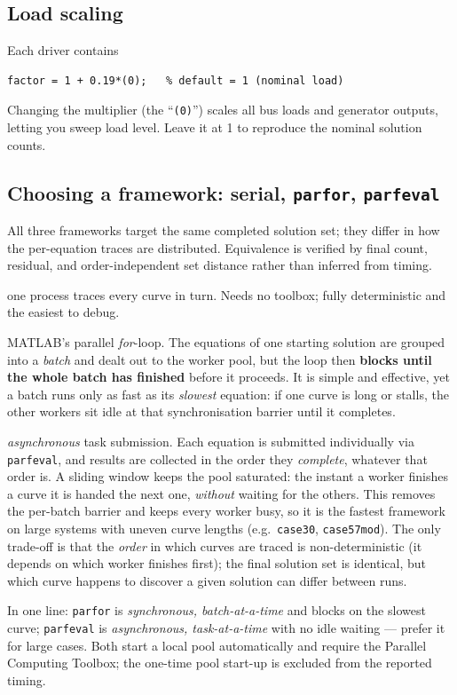 \documentclass[11pt,a4paper]{article}
\newcommand{\code}[1]{\texttt{#1}}
\begin{document}
\subsection{Load scaling}
Each driver contains
\begin{lstlisting}[style=mat]
factor = 1 + 0.19*(0);   % default = 1 (nominal load)
\end{lstlisting}
Changing the multiplier (the ``\code{(0)}'') scales all bus loads and generator outputs,
letting you sweep load level. Leave it at 1 to reproduce the nominal solution counts.

\subsection{Choosing a framework: serial, \code{parfor}, \code{parfeval}}\label{sec:frameworks}
All three frameworks target the same completed solution set; they differ in how the
per-equation traces are distributed. Equivalence is verified by final count, residual,
and order-independent set distance rather than inferred from timing.
\begin{description}[leftmargin=0em,style=nextline]
\item[Serial (\code{run_batch.m})] one process traces every curve in turn. Needs no
      toolbox; fully deterministic and the easiest to debug.
\item[\code{parfor} (\code{run_batch_par.m})] MATLAB's parallel \emph{for}-loop. The
      equations of one starting solution are grouped into a \emph{batch} and dealt out to
      the worker pool, but the loop then \textbf{blocks until the whole batch has
      finished} before it proceeds. It is simple and effective, yet a batch runs only as
      fast as its \emph{slowest} equation: if one curve is long or stalls, the other
      workers sit idle at that synchronisation barrier until it completes.
\item[\code{parfeval} (\code{run_batch_parfeval.m})] \emph{asynchronous} task submission.
      Each equation is submitted individually via \code{parfeval}, and results are
      collected in the order they \emph{complete}, whatever that order is. A sliding window
      keeps the pool saturated: the instant a worker finishes a curve it is handed the next
      one, \emph{without} waiting for the others. This removes the per-batch barrier and
      keeps every worker busy, so it is the fastest framework on large systems with uneven
      curve lengths (e.g.\ \code{case30}, \code{case57mod}). The only trade-off is that the
      \emph{order} in which curves are traced is non-deterministic (it depends on which
      worker finishes first); the final solution set is identical, but which curve happens
      to discover a given solution can differ between runs.
\end{description}
In one line: \code{parfor} is \emph{synchronous, batch-at-a-time} and blocks on the slowest
curve; \code{parfeval} is \emph{asynchronous, task-at-a-time} with no idle waiting ---
prefer it for large cases. Both start a local pool automatically and require the Parallel
Computing Toolbox; the one-time pool start-up is excluded from the reported timing.
\end{document}
